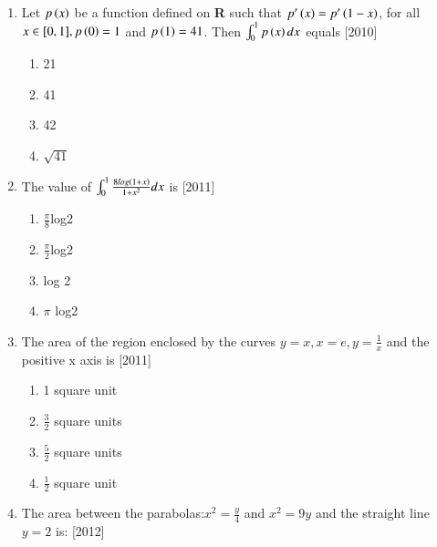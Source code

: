 \documentclass[journal,12pt,twocolumn]{IEEEtran}
\theoremstyle{remark}
\begin{document}
\begin{enumerate}[label=\textcolor{black}{\arabic*.}]

	\item Let $p\left(x\right)$ be a function defined on \textbf{R} such that $p'\left(x\right)=p'\left(1-x\right)$, for all $x\in[0,1],p\left(0\right)=1$ and $p\left(1\right)=41$. Then $\int_0^1p\left(x\right)dx$ equals
		\hfill{[2010]}

		\begin{multicols}{4}
			\begin{enumerate}[label=(\alph*)]
				\item 21
				\item 41
				\item 42
				\item $\sqrt{41}$
			\end{enumerate}
		\end{multicols}


	\item The value of $\int_0^1\frac{8log\left(1+x\right)}{1+x^2}dx$ is
		\hfill{[2011]}

		\begin{multicols}{2}
			\begin{enumerate}[label=(\alph*)]
				\item $\frac{\pi}{8}$log2
				\item $\frac{\pi}{2}$log2
				\item log 2
				\item $\pi$ log2
			\end{enumerate}
		\end{multicols}


	\item The area of the region enclosed by the curves $y=x, x=e, y=\frac{1}{x}$ and the positive x axis is
		\hfill{[2011]}

		\begin{multicols}{2}
			\begin{enumerate}[label=(\alph*)]
				\item 1 square unit
				\item $\frac{3}{2}$ square units
				\item $\frac{5}{2}$ square units
				\item $\frac{1}{2}$ square unit
			\end{enumerate}
		\end{multicols}


	\item The area between the parabolas:$x^2=\frac{y}{4}$ and $x^2=9y$ and the straight line $y=2$ is:
		\hfill{[2012]}


\end{enumerate}
\end{document}
